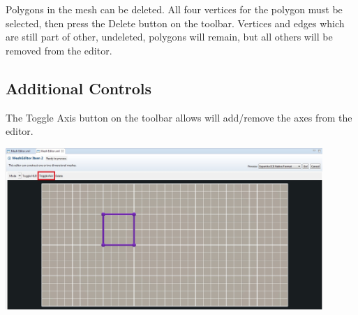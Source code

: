 \documentclass{article}
\begin{document}
Polygons in the mesh can be deleted. All four vertices for the polygon must be
selected, then press the Delete button on the toolbar. Vertices and edges which
are still part of other, undeleted, polygons will remain, but all others will be
removed from the editor.

\subsection{Additional Controls}

The Toggle Axis button on the toolbar allows will add/remove the axes from the
editor. 

\begin{center}
\includegraphics[width=12cm]{images/MeshEditorToggleAxis}
\end{center}
\end{document}
